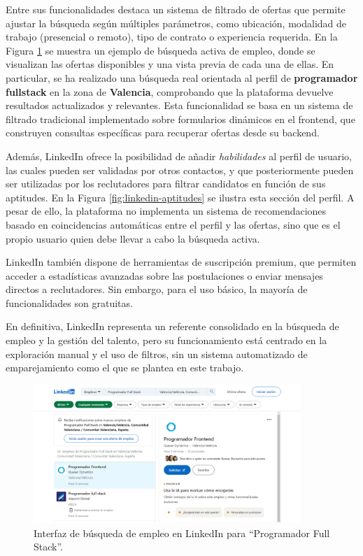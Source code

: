 Entre sus funcionalidades destaca un sistema de filtrado de ofertas que permite ajustar la 
búsqueda según múltiples parámetros, como ubicación, modalidad de trabajo (presencial o 
remoto), tipo de contrato o experiencia requerida. En la Figura \ref{fig:linkedin-ofertas} se muestra un ejemplo de 
búsqueda activa de empleo, donde se visualizan las ofertas disponibles y una vista previa de 
cada una de ellas. En particular, se ha realizado una búsqueda real orientada al perfil de 
\textbf{programador \gls{fullstack}} en la zona de \textbf{Valencia}, comprobando que la 
plataforma devuelve resultados actualizados y relevantes. Esta funcionalidad se basa en un 
sistema de filtrado tradicional implementado sobre formularios dinámicos en el 
\gls{frontend}, que construyen consultas específicas para recuperar ofertas desde su 
\gls{backend}.

Además, LinkedIn ofrece la posibilidad de añadir \textit{habilidades} al perfil de usuario, 
las cuales pueden ser validadas por otros contactos, y que posteriormente pueden ser 
utilizadas por los reclutadores para filtrar candidatos en función de sus aptitudes. 
En la Figura \ref{fig:linkedin-aptitudes} se ilustra esta sección del perfil. A pesar de ello, la plataforma no 
implementa un sistema de recomendaciones basado en coincidencias automáticas entre 
el perfil y las ofertas, sino que es el propio usuario quien debe llevar a cabo la búsqueda 
activa.

LinkedIn también dispone de herramientas de suscripción premium, que permiten acceder a 
estadísticas avanzadas sobre las postulaciones o enviar mensajes directos a reclutadores. 
Sin embargo, para el uso básico, la mayoría de funcionalidades son gratuitas.

En definitiva, LinkedIn representa un referente consolidado en la búsqueda de empleo y la 
gestión del talento, pero su funcionamiento está centrado en la exploración manual y el 
uso de filtros, sin un sistema automatizado de emparejamiento como el que se plantea en 
este trabajo.

\begin{figure}[H]
    \centering
    \includegraphics[width=0.9\textwidth]{figs/linkedin-ofertas.png}
    \caption{Interfaz de búsqueda de empleo en LinkedIn para ``Programador Full Stack''.}
    \label{fig:linkedin-ofertas}
  \end{figure}
  
